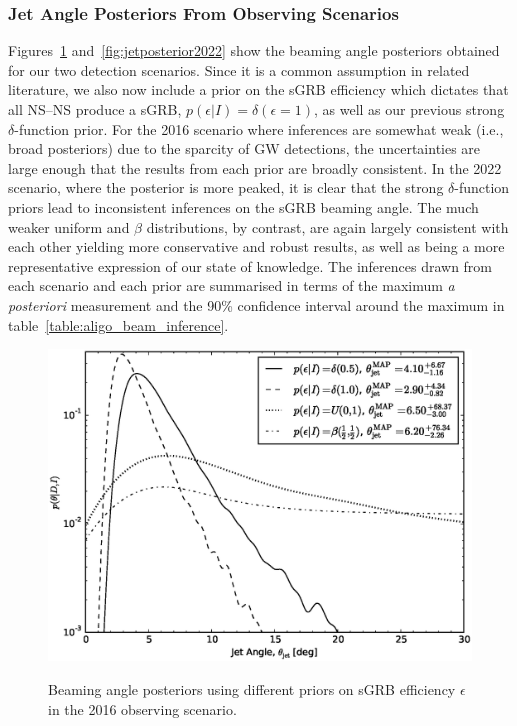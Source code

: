 \documentclass[twocolumn,nofootinbib]{revtex4-1}
\newcommand{\BNS}{\ac{NS}--\ac{NS}\xspace}
\begin{document}
\subsubsection{Jet Angle Posteriors From Observing Scenarios}
Figures~\ref{fig:jetposterior2016} and~\ref{fig:jetposterior2022} show the beaming angle posteriors obtained for our two detection scenarios.
Since it is a common assumption in related literature, we also now include a prior on the \ac{sGRB} efficiency which dictates that all \BNS produce a \ac{sGRB}, $p(\epsilon|I)=\delta(\epsilon=1)$, as well as our previous strong $\delta$-function prior.
For the 2016 scenario where inferences are somewhat weak (i.e., broad posteriors) due to the sparcity of \ac{GW} detections, the uncertainties are large enough that the results from each prior are broadly consistent.
In the 2022 scenario, where the posterior is more peaked, it is clear that the strong $\delta$-function priors lead to inconsistent inferences on the \ac{sGRB} beaming angle.
The much weaker uniform and $\beta$ distributions, by contrast, are again largely consistent with each other yielding more conservative and robust results, as well as being a more representative expression of our state of knowledge.
The inferences drawn from each scenario and each prior are summarised in terms of the maximum \emph{a posteriori} measurement and the 90\% confidence interval around the maximum in table~\ref{table:aligo_beam_inference}.

\begin{figure}
\centering
{\includegraphics[width=\linewidth]{jet_angle_posterior_aligo_2016_re_real.eps}}
\caption{Beaming angle posteriors using different priors on \ac{sGRB} efficiency $\epsilon$ in the 2016 observing scenario.
    \label{fig:jetposterior2016}}
\end{figure}
\end{document}
